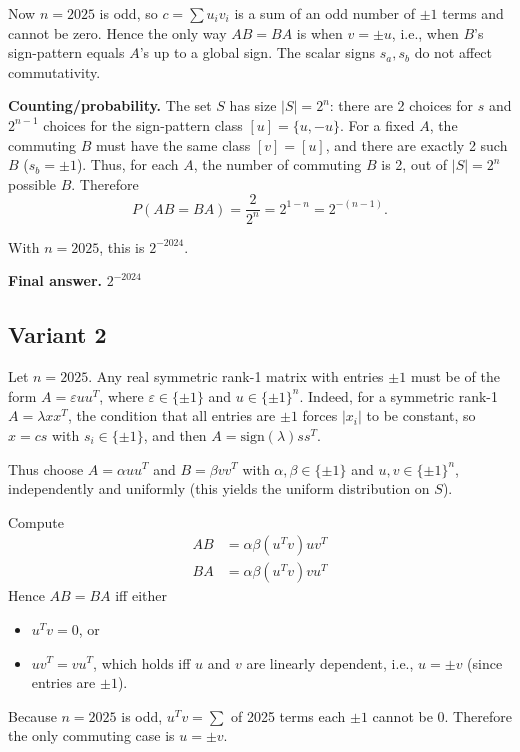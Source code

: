 \documentclass[12pt,a4paper]{article}
\theoremstyle{definition}
\begin{document}
    Now $n = 2025$ is odd, so $c = \sum u_i v_i$ is a sum of an odd number of $\pm 1$ terms and cannot be zero. Hence the only way $AB = BA$ is when $v = \pm u$, i.e., when $B$'s sign-pattern equals $A$'s up to a global sign. The scalar signs $s_a, s_b$ do not affect commutativity.

    \textbf{Counting/probability.} The set $S$ has size $|S| = 2^n$: there are 2 choices for $s$ and $2^{n-1}$ choices for the sign-pattern class $[u] = \{u, -u\}$. For a fixed $A$, the commuting $B$ must have the same class $[v] = [u]$, and there are exactly 2 such $B$ ($s_b = \pm 1$). Thus, for each $A$, the number of commuting $B$ is 2, out of $|S| = 2^n$ possible $B$. Therefore
    $$P(AB = BA) = \frac{2}{2^n} = 2^{1-n} = 2^{-(n-1)}.$$

    With $n = 2025$, this is $2^{-2024}$.

    \textbf{Final answer.}
    $2^{-2024}$
    \subsection{Variant 2}
    Let $n=2025$. Any real symmetric rank-1 matrix with entries $\pm 1$ must be of the form
    $A = \varepsilon u u^T$, where $\varepsilon \in \{\pm 1\}$ and $u \in \{\pm 1\}^n$.
    Indeed, for a symmetric rank-1 $A = \lambda x x^T$, the condition that all entries are $\pm 1$ forces $|x_i|$ to be constant, so $x = c s$ with $s_i \in \{\pm 1\}$, and then $A = \text{sign}(\lambda) s s^T$.

    Thus choose $A = \alpha u u^T$ and $B = \beta v v^T$ with $\alpha, \beta \in \{\pm 1\}$ and $u, v \in \{\pm 1\}^n$, independently and uniformly (this yields the uniform distribution on $S$).

    Compute
    \begin{align}
        AB &= \alpha\beta (u^T v) u v^T\\
        BA &= \alpha\beta (u^T v) v u^T
    \end{align}
    Hence $AB = BA$ iff either
    \begin{itemize}
        \item $u^T v = 0$, or
        \item $u v^T = v u^T$, which holds iff $u$ and $v$ are linearly dependent, i.e., $u = \pm v$ (since entries are $\pm 1$).
    \end{itemize}

    Because $n = 2025$ is odd, $u^T v = \sum$ of 2025 terms each $\pm 1$ cannot be 0. Therefore the only commuting case is $u = \pm v$.
\end{document}
